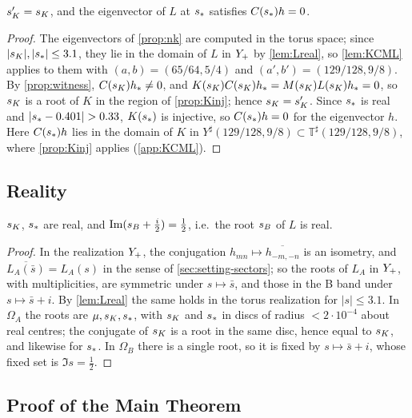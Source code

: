 \begin{corollary}\label{cor:sK}
$s_{K}'=s_{K}$, and the eigenvector of $L$ at $s_{\ast}$ satisfies $C(s_{\ast})h=0$.
\end{corollary}

\begin{proof}
The eigenvectors of \cref{prop:nk} are computed in the torus space; since $|s_{K}|,|s_{\ast}|\le3.1$, they lie in the
domain of $L$ in $Y_{+}$ by \cref{lem:Lreal}, so \cref{lem:KCML} applies to them with $(a,b)=(65/64,5/4)$ and
$(a',b')=(129/128,9/8)$. By \cref{prop:witness}, $C(s_{K})h_*\neq0$, and $K(s_{K})C(s_{K})h_*=M(s_{K})L(s_{K})h_*=0$, so $s_{K}$ is
a root of $K$ in the region of \cref{prop:Kinj}; hence $s_{K}=s_{K}'$. Since $s_{\ast}$ is real and $|\sphys-0.401|>0.33$,
$K(s_{\ast})$ is injective, so $C(s_{\ast})h=0$ for the eigenvector $h$. Here $C(s_{\ast})h$ lies in the domain of $K$ in $Y^\sharp(129/128,9/8)\subset\mathbb T^\sharp(129/128,9/8)$, where
\cref{prop:Kinj} applies (\cref{app:KCML}).
\end{proof}

\subsection{Reality}\label{sec:roots-reality}

\begin{proposition}\label{prop:real}
$s_{K}$, $s_{\ast}$ are real, and $\operatorname{Im}(s_{B}+\tfrac i2)=\tfrac12$, i.e.\ the root $s_{B}$ of $L$ is real.
\end{proposition}

\begin{proof}
In the realization $Y_{+}$, the conjugation $h_{mn}\mapsto\overline{h_{-m,-n}}$ is an isometry, and
$\overline{L_A(\bar s)}=L_A(s)$ in the sense of \cref{sec:setting-sectors}; so the roots of $L_A$ in $Y_{+}$, with
multiplicities, are symmetric under $s\mapsto\bar s$, and those in the B band under $s\mapsto\bar s+i$. By
\cref{lem:Lreal} the same holds in the torus realization for $|s|\le3.1$. In $\Omega_A$ the roots are $\mu,s_{K},s_{\ast}$,
with $s_{K}$ and $s_{\ast}$ in discs of radius $<2\cdot10^{-4}$ about real centres; the conjugate of $s_{K}$ is a root in the
same disc, hence equal to $s_{K}$, and likewise for $s_{\ast}$. In $\Omega_B$ there is a single root, so it is fixed by
$s\mapsto\bar s+i$, whose fixed set is $\Im s=\tfrac12$.
\end{proof}

\subsection{Proof of the Main Theorem}\label{sec:roots-proof}


